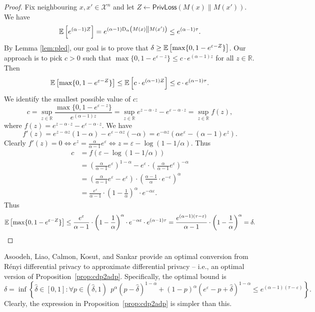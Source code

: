 \documentclass{jpcfinal} %
\newcommand{\ex}[2]{{\ifx&#1& \mathbb{E} \else
\underset{#1}{\mathbb{E}} \fi \left[#2\right]}}
\newcommand{\dr}[3]{\mathrm{D}_{#1}\left(#2\middle\|#3\right)}
\newcommand{\eps}{\varepsilon}
\newcommand{\privloss}[2]{\mathsf{PrivLoss}\left(#1\middle\|#2\right)}
\newcommand{\R}{\mathbb{R}}
\begin{document}
\begin{proof}






Fix neighbouring $x,x'\in\mathcal{X}^n$ and let $Z \gets \privloss{M(x)}{M(x')}$. We have $$\ex{}{e^{(\alpha-1)Z}} =e^{(\alpha-1)\dr{\alpha}{M(x)}{M(x')}}\le e^{(\alpha-1)\tau}.$$
By Lemma \ref{lem:pled}, our goal is to prove that $\delta \ge \ex{}{\max\{0,1-e^{\eps-Z}\}}$.
Our approach is to pick $c>0$ such that $\max\{0,1-e^{\eps-z}\} \le c \cdot e^{(\alpha-1)z}$ for all $z \in \R$. Then $$\ex{}{\max\{0,1-e^{\eps-Z}\}} \le \ex{}{c \cdot e^{(\alpha-1)Z}} \le c \cdot e^{(\alpha-1)\tau}.$$
We identify the smallest possible value of $c$: $$c = \sup_{z \in \R} \frac{\max\{0,1-e^{\eps-z}\}}{e^{(\alpha-1)z}} = \sup_{z \in \R} e^{z -\alpha \cdot z} - e^{\eps-\alpha \cdot z} = \sup_{z \in \R} f(z),$$ where $f(z) = e^{z -\alpha \cdot z} - e^{\eps-\alpha \cdot z}$. We have $$f'(z) = e^{z-\alpha z}(1-\alpha) - e^{\eps - \alpha z}(-\alpha) = e^{-\alpha z} (\alpha e^\eps - (\alpha-1)e^z).$$ Clearly $f'(z)=0 \iff e^z = \frac{\alpha}{\alpha-1}e^\eps \iff z = \eps - \log(1-1/\alpha)$. Thus \begin{align*}
    c&=f(\eps-\log(1-1/\alpha))\\
    &= \left(\frac{\alpha}{\alpha-1}e^\eps\right)^{1-\alpha} - e^\eps \cdot \left(\frac{\alpha}{\alpha-1}e^\eps\right)^{-\alpha}\\
    &= \left(\frac{\alpha}{\alpha-1}e^\eps - e^\eps\right) \cdot \left(\frac{\alpha-1}{\alpha}\cdot e^{-\eps}\right)^\alpha\\
    &= \frac{e^\eps}{\alpha-1} \cdot \left(1-\frac{1}{\alpha}\right)^\alpha \cdot e^{-\alpha\eps}.
\end{align*} 
Thus 
\[
  \ex{}{\max\{0,1-e^{\eps-Z}\}} \le \frac{e^\eps}{\alpha-1} \cdot \left(1-\frac{1}{\alpha}\right)^\alpha \cdot e^{-\alpha\eps} \cdot e^{(\alpha-1)\tau} 
  = \frac{e^{(\alpha-1)(\tau-\eps)}}{\alpha-1} \cdot \left(1-\frac{1}{\alpha}\right)^\alpha 
  = \delta.
\]
\end{proof}

Asoodeh, Liao, Calmon, Kosut, and Sankar \cite{AsoodehLCKS20} provide an optimal conversion from R\'enyi differential privacy to approximate differential privacy -- i.e., an optimal version of Proposition~\ref{prop:cdp2adp}. Specifically, the optimal bound is
\begin{equation}
    \delta = \inf \left\{ \hat\delta \in [0,1] : \forall p \in (\hat\delta,1) ~~ p^\alpha(p-\hat\delta)^{1-\alpha} + (1-p)^\alpha(e^\eps-p+\hat\delta)^{1-\alpha} \le e^{(\alpha-1)(\tau -\eps)} \right\}.
\end{equation} Clearly, the expression in Proposition~\ref{prop:cdp2adp} is simpler than this. 
\end{document}
